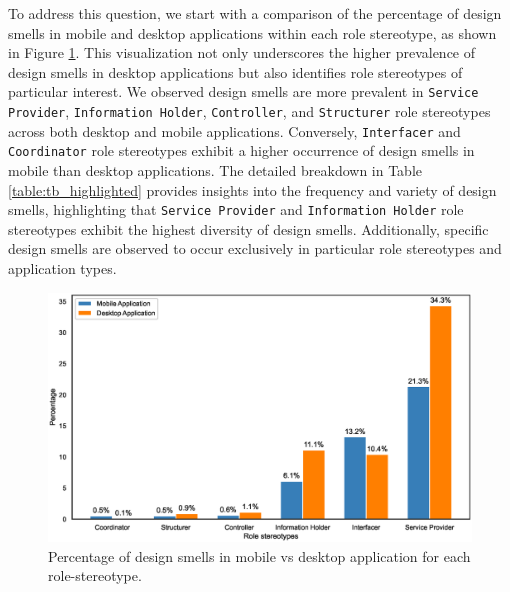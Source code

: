 \documentclass[AMA,Times1COL]{WileyNJDv5} %
\begin{document}
	To address this question, we start with a comparison of the percentage of design smells in mobile and desktop applications within each role stereotype, as shown in Figure \ref{fig:bar_chart_percentage}. This visualization not only underscores the higher prevalence of design smells in desktop applications but also identifies role stereotypes of particular interest. We observed design smells are more prevalent in {\tt Service Provider}, {\tt Information Holder}, {\tt Controller}, and {\tt Structurer} role stereotypes across both desktop and mobile applications. Conversely, {\tt Interfacer} and {\tt Coordinator} role stereotypes exhibit a higher occurrence of design smells in mobile than desktop applications. The detailed breakdown in Table \ref{table:tb_highlighted} provides insights into the frequency and variety of design smells, highlighting that {\tt Service Provider} and {\tt Information Holder} role stereotypes exhibit the highest diversity of design smells. Additionally, specific design smells are observed to occur exclusively in particular role stereotypes and application types.
	
	\begin{figure}[h]
		\centering
		\includegraphics[scale=0.50]{figures/barchart_mobile_desktop}
		\caption{Percentage of design smells in mobile vs desktop application for each role-stereotype.}
		\label{fig:bar_chart_percentage}
	\end{figure}
	
\end{document}
